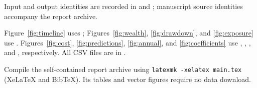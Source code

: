 Input and output identities are recorded in  and ; manuscript source identities accompany the report archive.

Figure~\ref{fig:timeline} uses ; Figures~\ref{fig:wealth}, \ref{fig:drawdown}, and \ref{fig:exposure} use . Figures~\ref{fig:cost}, \ref{fig:predictions}, \ref{fig:annual}, and \ref{fig:coefficients} use , , , and , respectively. All CSV files are in .

Compile the self-contained report archive using \texttt{latexmk -xelatex main.tex} (XeLaTeX and BibTeX). Its tables and vector figures require no data download.
